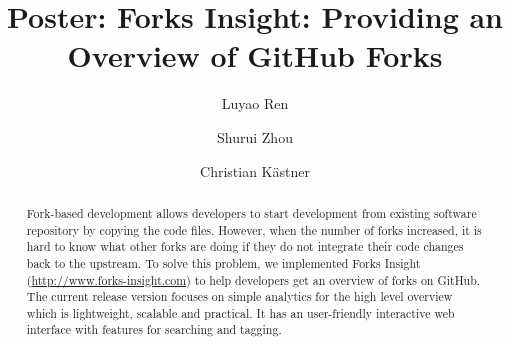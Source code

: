\documentclass[sigconf]{acmart}
\begin{document}
\title{Poster: Forks Insight: Providing an Overview of GitHub Forks}

	\author{Luyao Ren}

	\author{Shurui Zhou}
	
	\author{Christian K\"{a}stner} 

	\iffalse
       \author{Andrzej W\k{a}sowski}
	\affiliation{%
		\institution{IT University of Copenhagen}
	}
	\fi


	\renewcommand{\shortauthors}{L. Ren et al.}
	

\begin{abstract}
Fork-based development allows developers to start development from existing software repository by copying the code files. However, when the number of forks increased, it is hard to know what other forks are doing if they do not integrate their code changes back to the upstream. To solve this problem, we implemented Forks Insight (\url{http://www.forks-insight.com}) to help developers get an overview of forks on GitHub. The current release version focuses on simple analytics for the high level overview which is lightweight, scalable and practical. It has an user-friendly interactive web interface with features for searching and tagging.

\end{abstract}



\maketitle



 
\end{document}
